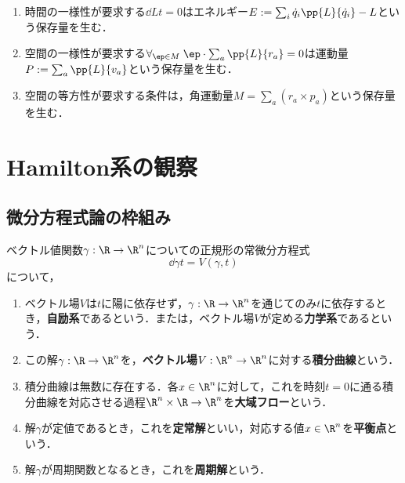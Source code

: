 \documentclass[uplatex,dvipdfmx]{jsreport}
\begin{document}
\begin{example}\mbox{}
    \begin{enumerate}
        \item 時間の一様性が要求する$\dd{L}{t}=0$はエネルギー$E:=\sum_{i}\dot{q}_i\pp{L}{\dot{q}_i}-L$という保存量を生む．
        \item 空間の一様性が要求する$\forall_{\ep\in M}\;\ep\cdot\sum_{a}\pp{L}{r_a}=0$は運動量$P:=\sum_{a}\pp{L}{v_a}$という保存量を生む．
        \item 空間の等方性が要求する条件は，角運動量$M=\sum_a(r_a\times p_a)$という保存量を生む．
    \end{enumerate}
\end{example}

\section{Hamilton系の観察}

\subsection{微分方程式論の枠組み}

\begin{definition}
    ベクトル値関数$\gamma:\R\to\R^n$についての正規形の常微分方程式
    \[\dd{\gamma}{t}=V(\gamma,t)\]
    について，
    \begin{enumerate}
        \item ベクトル場$V$は$t$に陽に依存せず，$\gamma:\R\to\R^n$を通じてのみ$t$に依存するとき，\textbf{自励系}であるという．または，ベクトル場$V$が定める\textbf{力学系}であるという．
        \item この解$\gamma:\R\to\R^n$を，\textbf{ベクトル場}$V:\R^n\to\R^n$に対する\textbf{積分曲線}という．
        \item 積分曲線は無数に存在する．各$x\in\R^n$に対して，これを時刻$t=0$に通る積分曲線を対応させる過程$\R^n\times\R\to\R^n$を\textbf{大域フロー}という．
        \item 解$\gamma$が定値であるとき，これを\textbf{定常解}といい，対応する値$x\in\R^n$を\textbf{平衡点}という．
        \item 解$\gamma$が周期関数となるとき，これを\textbf{周期解}という．
    \end{enumerate}
\end{definition}
\end{document}
